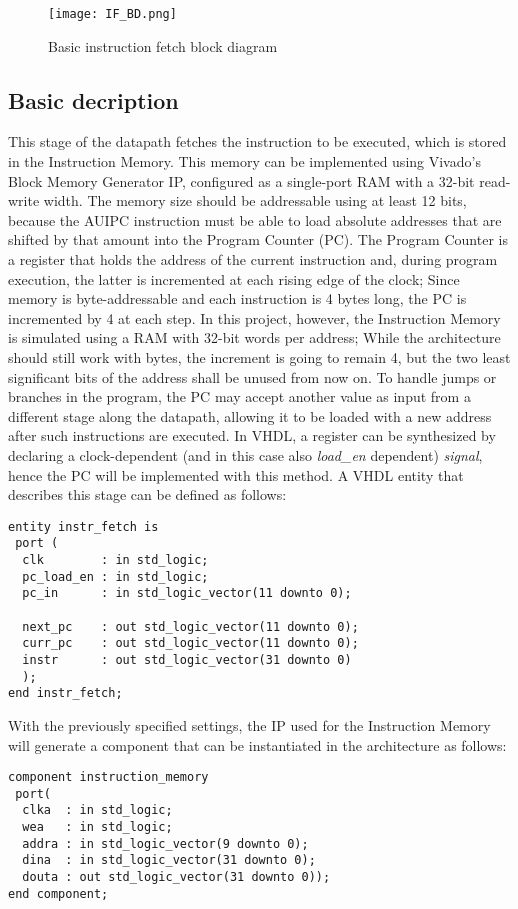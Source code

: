 \begin{figure}[ht!]
  \centering
  \texttt{[image: IF\_BD.png]}
  \caption{Basic instruction fetch block diagram}
  \label{fig:IF_BD}
\end{figure}
\subsection{Basic decription}
This stage of the datapath fetches the instruction to be executed, which is stored in the Instruction Memory. This memory can be implemented using Vivado's Block Memory Generator IP, configured as a single-port RAM with a 32-bit read-write width. The memory size should be addressable using at least 12 bits, because the AUIPC instruction must be able to load absolute addresses that are shifted by that amount into the Program Counter (PC).
The Program Counter is a register that holds the address of the current instruction and, during program execution, the latter is incremented at each rising edge of the clock; Since memory is byte-addressable and each instruction is 4 bytes long, the PC is incremented by 4 at each step. 
In this project, however, the Instruction Memory is simulated using a RAM with 32-bit words per address; While the architecture should still work with bytes, the increment is going to remain 4, but the two least significant bits of the address shall be unused from now on.
To handle jumps or branches in the program, the PC may accept another value as input from a different stage along the datapath, allowing it to be loaded with a new address after such instructions are executed.
In VHDL, a register can be synthesized by declaring a clock-dependent (and in this case also \emph{load{\_}en} dependent) \emph{signal}, hence the PC will be implemented with this method.
A VHDL entity that describes this stage can be defined as follows:\\
\begin{verbatim}
entity instr_fetch is
 port ( 
  clk        : in std_logic;
  pc_load_en : in std_logic;
  pc_in      : in std_logic_vector(11 downto 0);

  next_pc    : out std_logic_vector(11 downto 0);
  curr_pc    : out std_logic_vector(11 downto 0);
  instr      : out std_logic_vector(31 downto 0)
  );
end instr_fetch;
\end{verbatim}
\vspace{1\baselineskip}
With the previously specified settings, the IP used for the Instruction Memory will generate a component that can be instantiated in the architecture as follows:\\
\begin{verbatim}
component instruction_memory
 port(
  clka  : in std_logic;
  wea   : in std_logic;
  addra : in std_logic_vector(9 downto 0);
  dina  : in std_logic_vector(31 downto 0);
  douta : out std_logic_vector(31 downto 0));
end component;
\end{verbatim}
\vspace{1\baselineskip}

